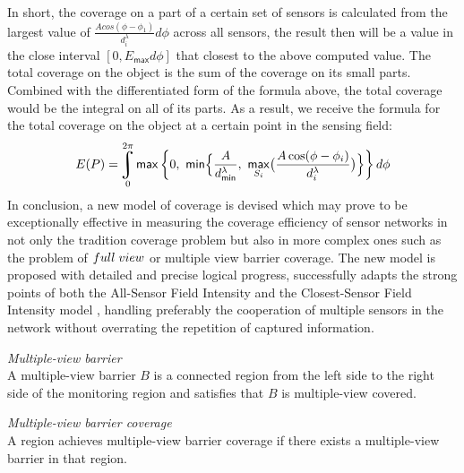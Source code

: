 In short, the coverage on a part of a certain set of sensors is calculated from the largest value of $\displaystyle\frac{Acos(\phi - \phi_1)}{d_i^\lambda}d\phi$ across all sensors, the result then will be a value in the close interval $[0, E_{\mathsf{max}}d\phi]$ that closest to the above computed value. The total coverage on the object is the sum of the coverage on its small parts. Combined with the differentiated form of the formula above, the total coverage would be the integral on all of its parts. As a result, we receive the formula for the total coverage on the object at a certain point in the sensing field:
\begin{equation}
E(P) = \uint\limits_0^{2\pi}{\mathsf{max}\left\{0,\ \mathsf{min}\Big\{\frac{A}{d_{\mathsf{min}}^\lambda}, \ \underset{S_i}{\mathsf{max}}\big(\frac{A\cos(\phi - \phi_i)}{d_i^\lambda}\big)\Big\}\right\}d\phi}
\end{equation}
In conclusion, a new model of coverage is devised which may prove to be exceptionally effective in measuring the coverage efficiency of sensor networks in not only the tradition coverage problem but also in more complex ones such as the problem of $full\hspace{1mm}view$ or multiple view barrier coverage. The new model is proposed with detailed and precise logical progress, successfully adapts the strong points of both the All-Sensor Field Intensity and the Closest-Sensor Field Intensity model \cite{megerian2002exposure}, handling preferably the cooperation of multiple sensors in the network without overrating the repetition of captured information.

\begin{df}{\itshape Multiple-view barrier}\\
	A multiple-view barrier $B$ is a connected region from the left side to the right side of the monitoring region and satisfies that $B$ is multiple-view covered.
\end{df}
\begin{df}{\itshape Multiple-view barrier coverage}\\
	A region achieves multiple-view barrier coverage if there exists a multiple-view barrier in that region.\par
\end{df}

